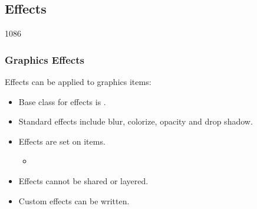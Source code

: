 %
%
%
%

\subsection{Effects}

\begin{slide}{1086}\frametitle{Graphics Effects}

Effects can be applied to graphics items:

\begin{itemize}
\item Base class for effects is .
\item Standard effects include blur, colorize, opacity and drop shadow.
\item Effects are set on items.
  \begin{itemize}
  \item {}
  \end{itemize}
\item Effects cannot be shared or layered.
\item Custom effects can be written.
\end{itemize}

\begin{center}
\end{center}

\end{slide}

